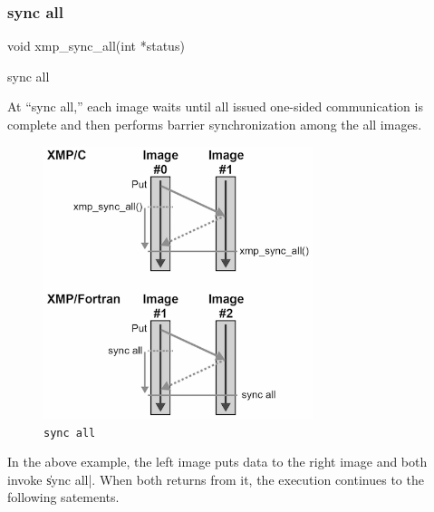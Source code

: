 \subsubsection{sync all}


\begin{XCexample}
void xmp_sync_all(int *status)
\end{XCexample}

\begin{XFexample}
sync all
\end{XFexample}

At ``sync all,'' each image waits until all issued one-sided
communication is complete and then performs barrier synchronization
among the all images.

\begin{figure}
  \centering
  \includegraphics[width=0.7\textwidth]{figs/sync_all.png}
  \caption{{\tt sync all}}
\end{figure}

In the above example, the left image puts data to the right image and
both {\nodes} invoke \|sync all|. When both {\nodes} returns from it, the
execution continues to the following satements.



